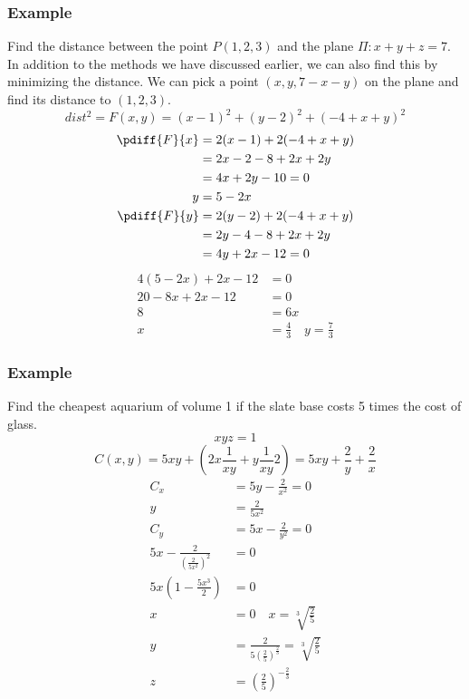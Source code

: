 \documentclass{math}
\begin{document}
\subsubsection*{Example}
Find the distance between the point \( P(1,2,3) \) and the plane \( \Pi: x+y+z
= 7 \). \\
In addition to the methods we have discussed earlier, we can also find this by
minimizing the distance. We can pick a point \( (x,y,7-x-y) \) on the plane
and find its distance to \( (1,2,3) \).
\[ dist^2 = F(x,y) = (x-1)^2+(y-2)^2+(-4+x+y)^2 \]
\begin{align*}
  \pdiff{F}{x} &= 2(x-1)+2(-4+x+y) \\
  &= 2x-2-8+2x+2y \\
  &= 4x+2y-10 = 0 \\
  y &= 5-2x \\
  \pdiff{F}{y} &= 2(y-2)+2(-4+x+y) \\
  &= 2y-4-8+2x+2y \\
  &= 4y+2x-12 = 0
\end{align*}
\begin{align*}
  4(5-2x)+2x-12 &= 0 \\
  20-8x+2x-12 &= 0 \\
  8 &= 6x \\
  x &= \frac{4}{3} \quad y = \frac{7}{3}
\end{align*}

\subsubsection*{Example}
Find the cheapest aquarium of volume 1 if the slate base costs 5 times the cost
of glass.
\[ xyz = 1 \]
\[ C(x,y) = 5xy+(2x\frac{1}{xy}+y\frac{1}{xy}2) = 5xy+\frac{2}{y}+\frac{2}{x} \]
\begin{align*}
  C_x &= 5y-\frac{2}{x^2} = 0 \\
  y &= \frac{2}{5x^2} \\
  C_y &= 5x-\frac{2}{y^2} = 0 \\
  5x-\frac{2}{(\frac{2}{5x^2})^2} &= 0 \\
  5x(1-\frac{5x^3}{2}) &= 0 \\
  x &= 0 \quad x = \sqrt[3]{\frac{2}{5}} \\
  y &= \frac{2}{5(\frac{2}{5})^{\frac{2}{3}}} = \sqrt[3]{\frac{2}{5}} \\
  z &= \left(\frac{2}{5}\right)^{-\frac{2}{3}}
\end{align*}
\end{document}
